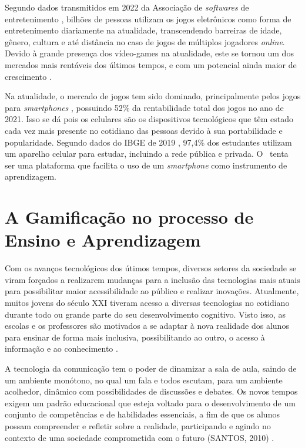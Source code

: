 Segundo dados transmitidos em 2022 da Associação de \textit{softwares} de entretenimento \cite{esa_report_2022}, bilhões de pessoas utilizam os jogos eletrônicos como forma de entretenimento diariamente na atualidade, transcendendo barreiras de idade, gênero, cultura e até distância no caso de jogos de múltiplos jogadores \textit{online}. Devido à grande presença dos vídeo-games na atualidade, este se tornou um dos mercados mais rentáveis dos últimos tempos, e com um potencial ainda maior de crescimento \cite{video-game-economics}.

Na atualidade, o mercado de jogos tem sido dominado, principalmente pelos jogos para \textit{smartphones} \cite{mobile-game-market}, possuindo 52\% da rentabilidade total dos jogos no ano de 2021. Isso se dá pois os celulares são os dispositivos tecnológicos que têm estado cada vez mais presente no cotidiano das pessoas devido à sua portabilidade e popularidade. Segundo dados do IBGE de 2019 \cite{ibge-mobile-use-study}, 97,4\% dos estudantes utilizam um aparelho celular para estudar, incluindo a rede pública e privada. O \appName\ tenta ser uma plataforma que facilita o uso de um \textit{smartphone} como instrumento de aprendizagem.

\section{A Gamificação no processo de Ensino e Aprendizagem}

Com os avanços tecnológicos dos útimos tempos, diversos setores da sociedade se viram forçados a realizarem mudanças para a inclusão das tecnologias mais atuais para possibilitar maior acessibilidade ao público e realizar inovações. Atualmente, muitos jovens do século XXI tiveram acesso a diversas tecnologias no cotidiano durante todo ou grande parte do seu desenvolvimento cognitivo. Visto isso, as escolas e os professores são motivados a se adaptar à nova realidade dos alunos para ensinar de forma mais inclusiva, possibilitando ao outro, o acesso à informação e ao conhecimento \cite{tecnologia-professores}.

A tecnologia da comunicação tem o poder de dinamizar a sala de aula, saindo de um ambiente monótono, no qual um fala e todos escutam, para um ambiente acolhedor, dinâmico com possibilidades de discussões e debates. Os novos tempos exigem um padrão educacional que esteja voltado para o desenvolvimento de um conjunto de competências e de habilidades essenciais, a fim de que os alunos possam compreender e refletir sobre a realidade, participando e agindo no contexto de uma sociedade comprometida com o futuro (SANTOS, 2010) \cite{tecnologia-professores}.

